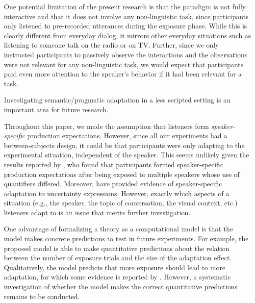 \documentclass[man, floatsintext]{apa6}
\newcommand{\jd}[1]{\textcolor{PinkyPurple}{\textbf{[jd: #1]}}}
\begin{document}
One potential limitation of the present research is that the paradigm is not fully interactive and that it does not involve
any non-linguistic task, since participants only listened to pre-recorded utterances during the exposure phase. 
While this is clearly different from everyday dialog, it mirrors other everyday situations such as listening to someone 
talk on the radio or on TV. Further, since we only instructed participants to passively observe the interactions and the observations 
were not relevant for any non-linguistic task, we would expect that participants paid even more attention to the speaker's behavior 
if it had been relevant for a task. 


Investigating semantic/pragmatic adaptation in a less scripted setting is 
an important area for future research.


Throughout this paper, we made the assumption that listeners  form \textit{speaker-specific} production expectations. However,
since all our experiments had a between-subjects design, it could be that participants were only adapting to the experimental
situation, independent of the speaker. This seems unlikely given the results reported by \textcite{Yildirim2016}, who found that
participants formed speaker-specific production expectations after being exposed to multiple speakers whose use of
quantifiers differed. Moreover,  \parencite{Schuster2019} have provided evidence of speaker-specific adaptation to 
uncertainty expressions. However, exactly which aspects of a situation (e.g., the speaker, the topic of conversation, the visual context, etc.)
listeners adapt to is an issue that merits further investigation.


One advantage of formalizing a theory as a computational model is that the model 
makes concrete predictions to test in future experiments. For example, the proposed
model is able to make quantitative predictions about the relation between the number of exposure
trials and the size of the adaptation effect. Qualitatively, the model predicts that more exposure
should lead to more adaptation, for which some evidence is reported by \textcite{Schuster2019}.
However,  a systematic investigation of whether the model makes the correct quantitative predictions remains to be conducted. 
\end{document}
